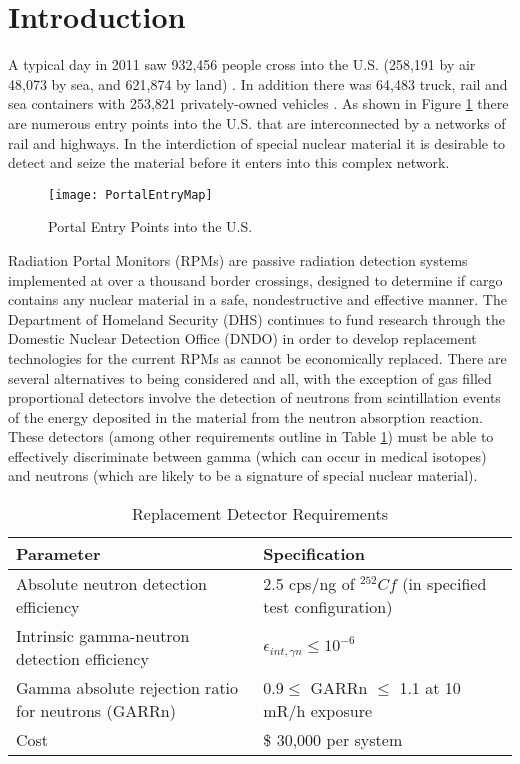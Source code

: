 \section{Introduction}
A typical day in 2011 saw 932,456 people cross into the U.S. (258,191 by air 48,073 by sea, and 621,874 by land) \cite{cpb_typical_2012}.
In addition there was 64,483 truck, rail and sea containers with 253,821 privately-owned vehicles \cite{cpb_typical_2012}.
As shown in Figure \ref{fig:PortalEntryMap} there are numerous entry points into the U.S. that are interconnected by a networks of rail and highways.
In the interdiction of special nuclear material it is desirable to detect and seize the material before it enters into this complex network.
\begin{figure}
    \texttt{[image: PortalEntryMap]}
	\caption{Portal Entry Points into the U.S.}
    \label{fig:PortalEntryMap}
\end{figure}
Radiation Portal Monitors (RPMs) are passive radiation detection systems implemented at over a thousand border crossings, designed to determine if cargo contains any nuclear material in a safe, nondestructive and effective manner\cite{kouzes_neutron_2010}.
The Department of Homeland Security (DHS) continues to fund research through the Domestic Nuclear Detection Office (DNDO) in order to develop replacement technologies for the current  RPMs as  cannot be economically replaced.
There are several alternatives to  being considered and all, with the exception of gas filled proportional detectors involve the detection of neutrons from scintillation events of the energy deposited in the material from the neutron absorption reaction.
These detectors (among other requirements outline in Table \ref{tab:DHSCriteria}) must be able to effectively discriminate between gamma (which can occur in medical isotopes) and neutrons (which are likely to be a signature of special nuclear material).
\begin{table}[b]
    \caption{Replacement Detector Requirements \protect\cite{kouzes_neutron_1999}}
	\centering
	\begin{tabular}{p{} | p{} }
	Parameter & Specification \\
	\hline
	\hline
	Absolute neutron detection efficiency & 2.5 cps/ng of ${}^{252}Cf$ (in specified test configuration) \\
	Intrinsic gamma-neutron detection efficiency & $ \epsilon_{int,\gamma n}\leq 10^{-6}$ \\
	Gamma absolute rejection ratio for neutrons (GARRn) & $ 0.9 \leq \text{ GARRn }\leq$ 1.1 at 10 mR/h exposure \\
	Cost &  \$ 30,000 per system \\
	\hline
	\end{tabular}
    \label{tab:DHSCriteria}
\end{table}

